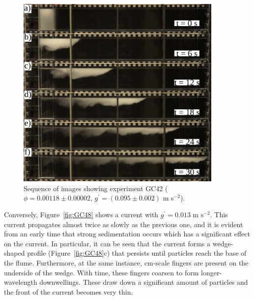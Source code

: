 \documentclass[authoryear,preprint,review,12pt]{elsarticle}
\begin{document}
\begin{figure}[ht!]
  \centerline{\includegraphics[width=0.9\textwidth]{GC42.png}}
  \caption{Sequence of images showing experiment GC42 ($\phi = 0.00118 \pm 0.00002$, $g^{\prime} = (0.095 \pm 0.002)$ m s$^{-2}$).}
  \label{fig:GC42}
\end{figure}

Conversely, Figure~\ref{fig:GC48} shows a current with $g^{\prime} = 0.013$ m s$^{-2}$. This current propagates almost twice as slowly as the previous one, and it is evident from an early time that strong sedimentation occurs which has a significant effect on the current. In particular, it can be seen that the current forms a wedge-shaped profile (Figure~\ref{fig:GC48}c) that persists until particles reach the base of the flume. Furthermore, at the same instance, cm-scale fingers are present on the underside of the wedge. With time, these fingers coarsen to form longer-wavelength downwellings. These draw down a significant amount of particles and the front of the current becomes very thin. 
\end{document}
